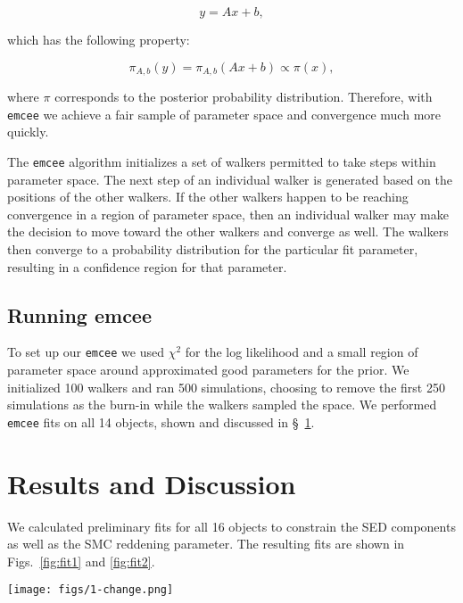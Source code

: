 \begin{equation}
  \label{eq:linearfunc}
  y = Ax + b,
\end{equation}

which has the following property: 

\begin{equation}
  \label{eq:linearfuncpi}
  \pi_{A,b}(y) = \pi_{A,b}(Ax+b) \propto \pi (x),
\end{equation} 

where $\pi$ corresponds to the posterior probability distribution.
Therefore, with \texttt{emcee} we achieve a fair sample of parameter space and convergence much more quickly.

The \texttt{emcee} algorithm initializes a set of walkers permitted to take steps within parameter space. The next step of an individual 
walker is generated based on the positions of the other walkers. If the other walkers happen to be reaching convergence in a region of 
parameter space, then an individual walker may make the decision to move toward the other walkers and converge as well. The walkers 
then converge to a probability distribution for the particular fit parameter, resulting in a confidence region for that parameter. 

\subsection{Running emcee}
\label{sec:run}

To set up our \texttt{emcee} we used $\chi^2$ for the log likelihood and a small region of parameter space around approximated good 
parameters for the prior. We initialized 100 walkers and ran 500 simulations, choosing to remove the first 250 simulations as the 
burn-in while the walkers sampled the space. We performed \texttt{emcee} fits on all 14 objects, shown and discussed 
in \S~\ref{sec:results}. 

\section{Results and Discussion}
\label{sec:results}

We calculated preliminary fits for all 16 objects to constrain the SED components as well as the SMC reddening parameter. The 
resulting fits are shown in Figs.~\ref{fig:fit1} and \ref{fig:fit2}.

\begin{figure*}
  \centering
  \texttt{[image: figs/1-change.png]}
  \caption{Fits of the first eight objects, corresponding to the objects listed in Tab.~\ref{tab:starlum}. Photometry is in black, 
           photometry that was not used in the fit is shown as red circles, 
           the host galaxy in blue, the quasar in orange, the starburst in green, and the final fit in red. The 99\% confidence 
           region for the fit is shown in gray.} 
           \label{fig:fit1}
\end{figure*}

